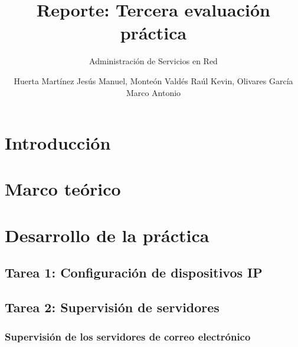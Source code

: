 \documentclass[oneside,10pt]{book}
\title{Reporte: Tercera evaluación práctica}
\subtitle{Administración de Servicios en Red}
\author{Huerta Martínez Jesús Manuel, Monteón Valdés Raúl Kevin, Olivares García Marco Antonio}
\begin{document}
\maketitle
\thispagestyle{empty}

\frontmatter
\tableofcontents

\mainmatter


\chapter{Introducción}


\chapter{Marco teórico}


\chapter{Desarrollo de la práctica}

\section{Tarea 1: Configuración de dispositivos IP}

\section{Tarea 2: Supervisión de servidores}

\subsection{Supervisión de los servidores de correo electrónico}
\end{document}
